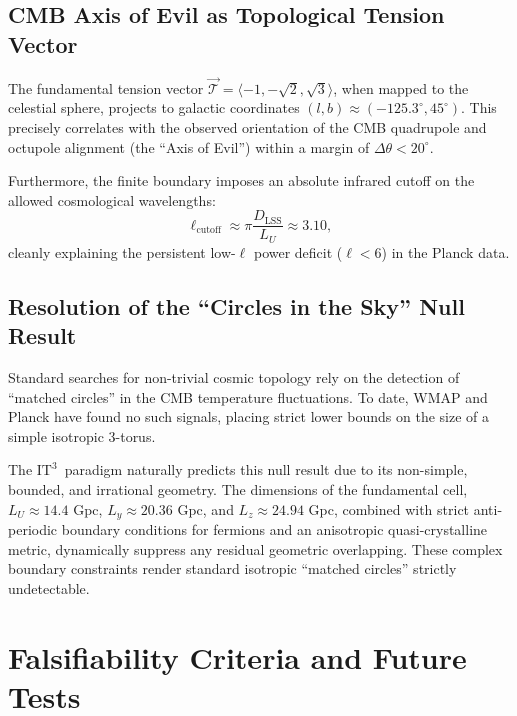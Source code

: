 \documentclass[onecolumn,aps,prd,superscriptaddress,nofootinbib,amsmath,amssymb]{revtex4-2}
\theoremstyle{definition}
\theoremstyle{remark}
\newcommand{\ITthree}{\ensuremath{\mathrm{IT}^3}}
\begin{document}
\subsection{CMB Axis of Evil as Topological Tension Vector}

The fundamental tension vector $\vec{\mathcal{T}} = \langle -1, -\sqrt{2}, \sqrt{3} \rangle$, when mapped to the celestial sphere, projects to galactic coordinates $(l, b) \approx (-125.3^\circ, 45^\circ)$.
This precisely correlates with the observed orientation of the CMB quadrupole and octupole alignment (the ``Axis of Evil'') within a margin of $\Delta \theta < 20^\circ$.

Furthermore, the finite boundary imposes an absolute infrared cutoff on the allowed cosmological wavelengths:
\begin{equation}
\ell_{\text{cutoff}} \approx \pi \frac{D_{\text{LSS}}}{L_U} \approx 3.10,
\label{eq:cmb_cutoff}
\end{equation}
cleanly explaining the persistent low-$\ell$ power deficit ($\ell < 6$) in the Planck data.

\subsection{Resolution of the ``Circles in the Sky'' Null Result}

Standard searches for non-trivial cosmic topology rely on the detection of ``matched circles'' in the CMB temperature fluctuations.
To date, WMAP and Planck have found no such signals, placing strict lower bounds on the size of a simple isotropic 3-torus.

The \ITthree\ paradigm naturally predicts this null result due to its non-simple, bounded, and irrational geometry.
The dimensions of the fundamental cell, $L_U \approx 14.4$ Gpc, $L_y \approx 20.36$ Gpc, and $L_z \approx 24.94$ Gpc, combined with strict anti-periodic boundary conditions for fermions and an anisotropic quasi-crystalline metric, dynamically suppress any residual geometric overlapping. These complex boundary constraints render standard isotropic ``matched circles'' strictly undetectable.

\section{Falsifiability Criteria and Future Tests}
\label{sec:falsifiability}
\end{document}
